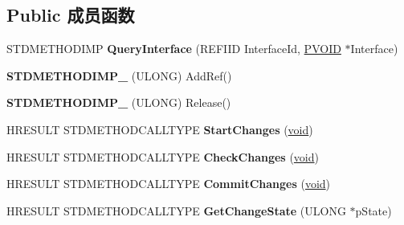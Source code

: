 \subsection*{Public 成员函数}
\begin{DoxyCompactItemize}
\item 
\mbox{\label{class_c_b_d_a_device_control_a70c850c1c59a1b9d8b7408c3aba1e40c}} 
S\+T\+D\+M\+E\+T\+H\+O\+D\+I\+MP {\bfseries Query\+Interface} (R\+E\+F\+I\+ID Interface\+Id, \hyperlink{interfacevoid}{P\+V\+O\+ID} $\ast$Interface)
\item 
\mbox{\label{class_c_b_d_a_device_control_a0626e1494e34a90b19e5f5765af42376}} 
{\bfseries S\+T\+D\+M\+E\+T\+H\+O\+D\+I\+M\+P\+\_\+} (U\+L\+O\+NG) Add\+Ref()
\item 
\mbox{\label{class_c_b_d_a_device_control_a3dd832ae2785be765a1d60dfc0cea538}} 
{\bfseries S\+T\+D\+M\+E\+T\+H\+O\+D\+I\+M\+P\+\_\+} (U\+L\+O\+NG) Release()
\item 
\mbox{\label{class_c_b_d_a_device_control_ae21c5e6312db91c27d448100b56b462b}} 
H\+R\+E\+S\+U\+LT S\+T\+D\+M\+E\+T\+H\+O\+D\+C\+A\+L\+L\+T\+Y\+PE {\bfseries Start\+Changes} (\hyperlink{interfacevoid}{void})
\item 
\mbox{\label{class_c_b_d_a_device_control_a079953b93e447675cdd688f8503b8bcb}} 
H\+R\+E\+S\+U\+LT S\+T\+D\+M\+E\+T\+H\+O\+D\+C\+A\+L\+L\+T\+Y\+PE {\bfseries Check\+Changes} (\hyperlink{interfacevoid}{void})
\item 
\mbox{\label{class_c_b_d_a_device_control_afb0a2fa6d6237be80ca5fc5dec788ae0}} 
H\+R\+E\+S\+U\+LT S\+T\+D\+M\+E\+T\+H\+O\+D\+C\+A\+L\+L\+T\+Y\+PE {\bfseries Commit\+Changes} (\hyperlink{interfacevoid}{void})
\item 
\mbox{\label{class_c_b_d_a_device_control_a19070f3744150b36acbe6ecc965b2940}} 
H\+R\+E\+S\+U\+LT S\+T\+D\+M\+E\+T\+H\+O\+D\+C\+A\+L\+L\+T\+Y\+PE {\bfseries Get\+Change\+State} (U\+L\+O\+NG $\ast$p\+State)
\item 
\mbox{\label{class_c_b_d_a_device_control_ad69a1cbe0835e799bcc980d3f8c4f714}} 

\end{DoxyCompactItemize}
